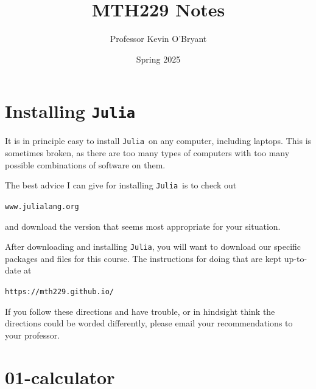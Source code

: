 \documentclass[12pt,answers]{book}
\title{MTH229 Notes}
\date{Spring 2025}
\author{Professor Kevin O'Bryant}
\newcommand{\julia}{{\tt Julia}}
\begin{document}
  \maketitle



\chapter*{Installing \julia}

It is in principle easy to install \julia\ on any computer, including laptops. This is sometimes broken, as there are too many types of computers with too many possible combinations of software on them.

The best advice I can give for installing \julia\ is to check out
\begin{center}
  \verb|www.julialang.org|
\end{center}
and download the version that seems most appropriate for your situation.

After downloading and installing \julia, you will want to download our specific packages and files for this course. The instructions for doing that are kept up-to-date at
\begin{center}
  \verb|https://mth229.github.io/|
\end{center}
If you follow these directions and have trouble, or in hindsight think the directions could be worded differently, please email your recommendations to your professor.

\chapter{01-calculator}
\end{document}
